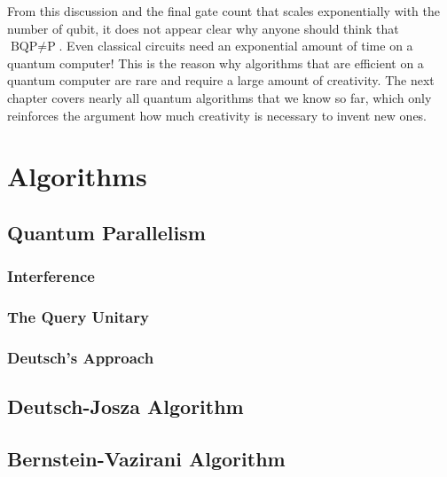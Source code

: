 		From this discussion and the final gate count that scales exponentially with the number of qubit, it does not appear clear why anyone should think that \( \text{BQP} \neq \text{P} \). Even classical circuits need an exponential amount of time on a quantum computer! This is the reason why algorithms that are efficient on a quantum computer are rare and require a large amount of creativity. The next chapter covers nearly all quantum algorithms that we know so far, which only reinforces the argument how much creativity is necessary to invent new ones.

\chapter{Algorithms} %
	\label{c:algorithms}


	\section{Quantum Parallelism} %

		\subsection{Interference} %

		\subsection{The Query Unitary} %

		\subsection{Deutsch's Approach} %

	\section{Deutsch-Josza Algorithm} %

	\section{Bernstein-Vazirani Algorithm} %

